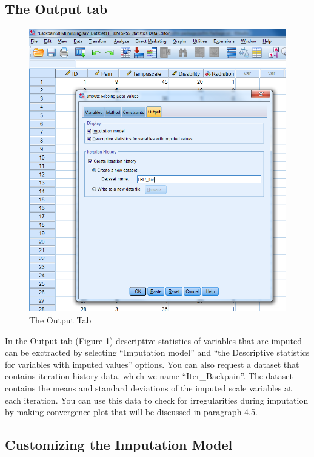 \documentclass[
]{book}
\begin{document}
\hypertarget{the-output-tab}{%
\subsection{The Output tab}\label{the-output-tab}}

\begin{figure}

{\centering \includegraphics[width=0.9\linewidth]{images/fig4.9} 

}

\caption{The Output Tab}\label{fig:fig4-9}
\end{figure}

In the Output tab (Figure \ref{fig:fig4-9}) descriptive statistics of variables that are imputed can be exctracted by selecting ``Imputation model'' and ``the Descriptive statistics for variables with imputed values'' options. You can also request a dataset that contains iteration history data, which we name ``Iter\_Backpain''. The dataset contains the means and standard deviations of the imputed scale variables at each iteration. You can use this data to check for irregularities during imputation by making convergence plot that will be discussed in paragraph 4.5.

\hypertarget{customizing-the-imputation-model}{%
\subsection{Customizing the Imputation Model}\label{customizing-the-imputation-model}}
\end{document}
